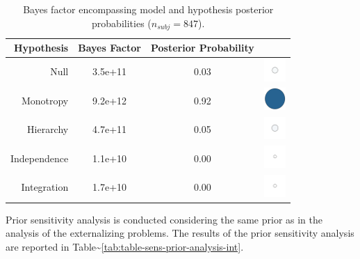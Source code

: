 \documentclass[
]{book}
\begin{document}
\begin{table}[!h]

\caption{\label{tab:table-bf-results-int}Bayes factor encompassing model and hypothesis posterior probabilities  ($n_{subj} = 847$).}
\centering
\begin{tabular}[t]{rcc>{\centering\arraybackslash}m{1cm}}
\toprule
\textbf{Hypothesis} & \textbf{Bayes Factor} & \textbf{Posterior Probability} & \textbf{ }\\
\midrule
Null & 3.5e+11 & 0.03 & \includegraphics[width=0.33in, height=0.33in]{images/ball_BF_int_null.png}\\
Monotropy & 9.2e+12 & 0.92 & \includegraphics[width=0.33in, height=0.33in]{images/ball_BF_int_monotropy.png}\\
Hierarchy & 4.7e+11 & 0.05 & \includegraphics[width=0.33in, height=0.33in]{images/ball_BF_int_hierarchy.png}\\
Independence & 1.1e+10 & 0.00 & \includegraphics[width=0.33in, height=0.33in]{images/ball_BF_int_independence.png}\\
Integration & 1.7e+10 & 0.00 & \includegraphics[width=0.33in, height=0.33in]{images/ball_BF_int_integration.png}\\
\bottomrule
\end{tabular}
\end{table}

Prior sensitivity analysis is conducted considering the same prior as in the analysis of the externalizing problems. The results of the prior sensitivity analysis are reported in Table\textasciitilde\ref{tab:table-sens-prior-analysis-int}.
\end{document}
